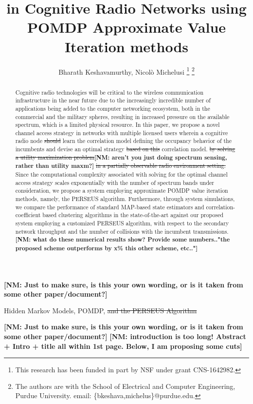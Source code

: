 \documentclass[10pt,twocolumn]{IEEEtran}
\title{\add{Spectrum Sensing}\sst{Utility Maximization} in Cognitive Radio Networks using POMDP Approximate Value Iteration methods}
\author{Bharath Keshavamurthy, Nicol\`{o} Michelusi
\thanks{This research has been funded in part by NSF under grant CNS-1642982.}
\thanks{The authors are with the School of Electrical and Computer Engineering, Purdue University. email: \{bkeshava,michelus\}@purdue.edu.}}
\newcommand{\sst}[1]{\st{#1}}
\newcommand{\nm}[1]{{\color{blue}\bf{[NM: #1]}}}
\newcommand{\add}[1]{{\color{red}{#1}}}
\begin{document}
 
\maketitle
{}
\nm{Just to make sure, is this your own wording, or is it taken from some other paper/document?}
\begin{abstract}
Cognitive radio technologies will be critical to the wireless communication infrastructure in the near future due to the increasingly incredible number of applications being added to the computer networking ecosystem, both in the commercial and the military spheres, resulting in increased pressure on the available spectrum, which is a limited physical resource. In this paper, we propose a novel channel access strategy in networks with multiple licensed users wherein a cognitive radio node\sst{ should} learn\add{s} the correlation model defining the occupancy behavior of the incumbents and devise\add{s} an optimal strategy \add{to perform spectrum sensing and access that exploits}\sst{ based on this} \add{the learned} correlation model.\sst{ by solving a utility maximization problem}\nm{aren't you just doing spectrum sensing, rather than utility maxm?}\sst{ in a partially observable radio environment setting.} Since the computational complexity associated with solving for the optimal \add{spectrum sensing and} channel access strategy scales exponentially with the number of spectrum bands under consideration, we propose a system employing approximate POMDP value iteration methods, namely, the PERSEUS algorithm. Furthermore, through system simulations, we compare the performance of standard MAP-based state estimators and correlation-coefficient based clustering algorithms in the state-of-the-art against our proposed system employing a customized PERSEUS algorithm, with respect to the secondary network throughput and the number of collisions with the incumbent transmissions.
\nm{what do these numerical results show? Provide some numbers.."the proposed scheme outperforms by x\% this other scheme, etc.."}
\end{abstract}
\begin{IEEEkeywords}
Hidden Markov Models, POMDP,\sst{ and the PERSEUS Algorithm}
\end{IEEEkeywords}
\nm{Just to make sure, is this your own wording, or is it taken from some other paper/document?}
\nm{introduction is too long! Abstract + Intro + title all within 1st page. Below, I am proposing some cuts}
\end{document}

